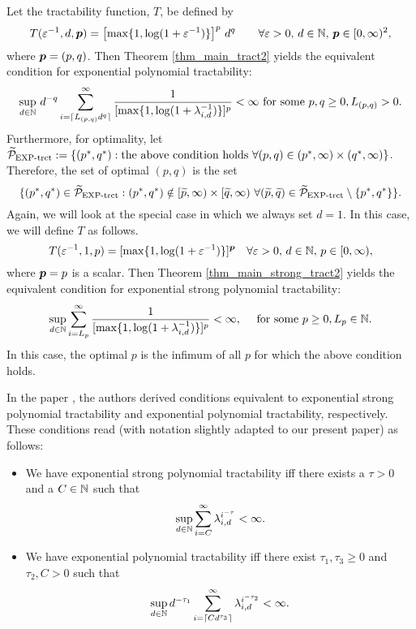 \documentclass[sort&compress]{elsarticle}
\begin{document}
\begin{example}
Let the tractability function, $T$,
be defined by
\[
 T(\varepsilon^{-1},d,\boldsymbol{p})=\left[\max\{1,\log(1+\varepsilon^{-1})\}\right]^p\, d^q \qquad \forall \varepsilon > 0, \,  d \in \mathbb{N}, \, \boldsymbol{p} \in [0,\infty)^2,
\] where $\boldsymbol{p} = (p,q)$. Then Theorem \ref{thm_main_tract2} yields  the equivalent condition for exponential polynomial tractability:
\begin{equation}\label{eq:exp_pt}
 \sup_{d\in\mathbb{N}}\, d^{-q} \sum_{i=\lceil L_{(p,q)} d^{q}\rceil}^\infty \frac{1}{[\max\{1,\log(1+\lambda_{i,d}^{-1})\}]^p} < \infty  \text{ for some } p,q \ge 0, L_{(p,q)} >0.
\end{equation}
Furthermore, for optimality, let $\widetilde{\mathcal{P}}_{\textup{EXP-trct}} : = \{(p^*,q^*) : \text{the above condition holds }\forall (p,q) \in (p^*,\infty)\times(q^*,\infty) \}$. Therefore, the set of optimal $(p,q)$ is the set 
\[
    \{(p^*,q^*) \in \widetilde{\mathcal{P}}_{\textup{EXP-trct}} : (p^*,q^*) \notin [\widetilde{p},\infty) \times [\widetilde{q},\infty)\, \, \forall (\widetilde{p},\widetilde{q}) \in \widetilde{\mathcal{P}}_{\textup{EXP-trct}}\setminus \{p^*,q^*\}  \}.
\]
Again, we will look at the special case in which we always set $d=1$. In this case, we will define $T$ as follows.
\[
T(\varepsilon^{-1},1,p)= [\max\{1,\log(1+\varepsilon^{-1})\}]^{\boldsymbol{p}} \quad \forall \varepsilon > 0, \,  d \in \mathbb{N}, \, p \in [0,\infty),\]
where $\boldsymbol{p}=p$ is a scalar. Then Theorem \ref{thm_main_strong_tract2} yields the equivalent condition for exponential strong polynomial tractability:
\begin{equation}\label{eq:exp_spt}
\sup_{d\in\mathbb{N}} \sum_{i=L_{p} }^\infty \frac{1}{[\max\{1,\log(1+\lambda_{i,d}^{-1})\}]^p}< \infty,\quad  \text{ for some } p \ge 0, L_{p} \in \mathbb{N}.
\end{equation}
In this case, the optimal $p$ is the infimum of all $p$ for which the above condition holds.
\end{example}

In the paper \cite{KriWoz19a}, the authors derived conditions equivalent to exponential strong polynomial tractability and exponential polynomial tractability, respectively. These conditions read (with notation slightly adapted to our present paper) as follows:
\begin{itemize}
    \item We have exponential strong polynomial tractability iff there exists a $\tau>0$ and
    a $C\in\mathbb{N}$ such that
    \begin{equation}\label{eq:KW_exp_spt}
        \sup_{d\in\mathbb{N}} \sum_{i=C}^{\infty} \lambda_{i,d}^{i^{-\tau}} < \infty.
    \end{equation}
    \item We have exponential polynomial tractability iff there exist $\tau_1,\tau_3\ge 0$ and $\tau_2, C>0$ such that
    \begin{equation}\label{eq:KW_exp_pt}
        \sup_{d\in\mathbb{N}} d^{-\tau_1} \sum_{i=\lceil C d^{\tau_3} \rceil}^{\infty} \lambda_{i,d}^{i^{-\tau_2}} < \infty.
    \end{equation}
\end{itemize}
\end{document}
